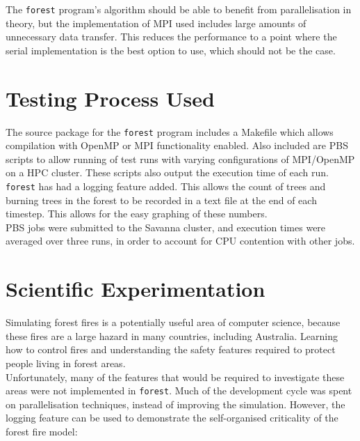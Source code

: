 \documentclass[11pt,a4paper]{report}
\begin{document}
The \texttt{forest} program's algorithm should be able to benefit from
parallelisation in theory, but the implementation of MPI used includes large
amounts of unnecessary data transfer. This reduces the performance to a point
where the serial implementation is the best option to use, which should not be
the case.

\section{Testing Process Used}

The source package for the \texttt{forest} program includes a Makefile which
allows compilation with OpenMP or MPI functionality enabled. Also included are
PBS scripts to allow running of test runs with varying configurations of
MPI/OpenMP on a HPC cluster. These scripts also output the execution time of
each run.\\

\texttt{forest} has had a logging feature added. This allows the count of trees
and burning trees in the forest to be recorded in a text file at the end of
each timestep. This allows for the easy graphing of these numbers.\\

PBS jobs were submitted to the Savanna cluster, and execution times were
averaged over three runs, in order to account for CPU contention with other
jobs.\\

\newpage
\section{Scientific Experimentation}

Simulating forest fires is a potentially useful area of computer science,
because these fires are a large hazard in many countries, including Australia.
Learning how to control fires and understanding the safety features required to
protect people living in forest areas.\\

Unfortunately, many of the features that would be required to investigate these
areas were not implemented in \texttt{forest}. Much of the development cycle
was spent on parallelisation techniques, instead of improving the simulation.
However, the logging feature can be used to demonstrate the self-organised
criticality of the forest fire model:\\
\end{document}
